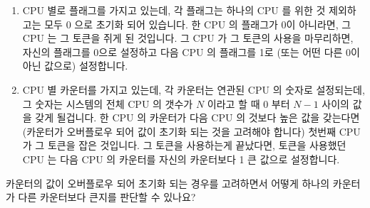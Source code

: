 \begin{enumerate}
\item	CPU 별로 플래그를 가지고 있는데, 각 플래그는 하나의 CPU 를 위한 것
	제외하고는 모두 0 으로 초기화 되어 있습니다.
	한 CPU 의 플래그가 0이 아니라면, 그 CPU 는 그 토큰을 쥐게 된 것입니다.
	그 CPU 가 그 토큰의 사용을 마무리하면, 자신의 플래그를 0으로 설정하고
	다음 CPU 의 플래그를 1로 (또는 어떤 다른 0이 아닌 값으로) 설정합니다.
\item	CPU 별 카운터를 가지고 있는데, 각 카운터는 연관된 CPU 의 숫자로
	설정되는데, 그 숫자는 시스템의 전체 CPU 의 갯수가 $N$ 이라고 할 때 0
	부터 $N-1$ 사이의 값을 갖게 될겁니다.
	한 CPU 의 카운터가 다음 CPU 의 것보다 높은 값을 갖는다면 (카운터가
	오버플로우 되어 값이 초기화 되는 것을 고려해야 합니다) 첫번째 CPU 가 그
	토큰을 잡은 것입니다.
	그 토큰을 사용하는게 끝났다면, 토큰을 사용했던 CPU 는 다음 CPU 의
	카운터를 자신의 카운터보다 1 큰 값으로 설정합니다.

\end{enumerate}

\QuickQuiz{}
	카운터의 값이 오버플로우 되어 초기화 되는 경우를 고려하면서 어떻게
	하나의 카운터가 다른 카운터보다 큰지를 판단할 수 있나요?
	\iffalse

